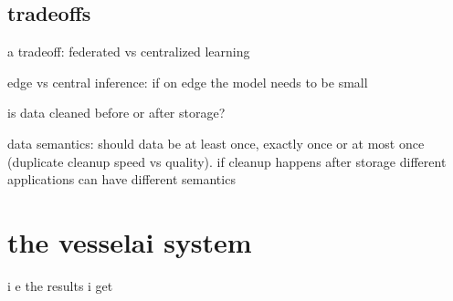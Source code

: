 \section{tradeoffs}

a tradeoff: federated vs centralized learning \cite{iotsurvey}

edge vs central inference: if on edge the model needs to be small \cite{iotsurvey}

is data cleaned before or after storage?

data semantics: should data be at least once, exactly once or at most once (duplicate cleanup speed vs quality). if cleanup happens after storage different applications can have different semantics

\chapter{the vesselai system}

i e the results i get





